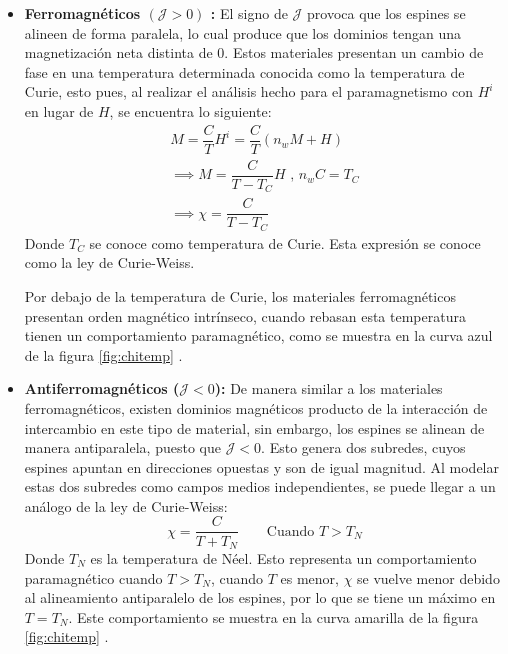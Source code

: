 \documentclass[../main.tex]{subfiles}
\begin{document}
\begin{itemize}
    \item \textbf{Ferromagnéticos $(\mathcal{J}>0)$ :} El signo de $\mathcal{J}$ provoca que los espines se alineen de forma paralela, lo cual produce que los dominios tengan una magnetización neta distinta de 0. Estos materiales presentan un cambio de fase en una temperatura determinada conocida como la temperatura de Curie, esto pues, al realizar el análisis hecho para el paramagnetismo con $H^i$ en lugar de $H$, se encuentra lo siguiente:
    \begin{equation}\begin{split}
        M=\dfrac{C}{T}H^i=\dfrac{C}{T}(n_wM+H)\\
        \implies M=\dfrac{C}{T-T_C}H\text{ , }n_wC=T_C\\
        \implies \chi=\dfrac{C}{T-T_C}
    \end{split}
        \label{eq:leycurieweiss}
    \end{equation}
    Donde $T_C$ se conoce como temperatura de Curie. Esta expresión se conoce como la ley de Curie-Weiss.

    Por debajo de la temperatura de Curie, los materiales ferromagnéticos presentan orden magnético intrínseco, cuando rebasan esta temperatura tienen un comportamiento paramagnético, como se muestra en la curva azul de la figura \ref{fig:chitemp} \cite{coey2010magnetism}.
    \item \textbf{Antiferromagnéticos ($\mathcal{J}<0$):} De manera similar a los materiales ferromagnéticos, existen dominios magnéticos producto de la interacción de intercambio en este tipo de material, sin embargo, los espines se alinean de manera antiparalela, puesto que $\mathcal{J}<0$. Esto genera dos subredes, cuyos espines apuntan en direcciones opuestas y son de igual magnitud. Al modelar estas dos subredes como campos medios independientes, se puede llegar a un análogo de la ley de Curie-Weiss:
    \begin{equation}
        \chi=\dfrac{C}{T+T_N}\qquad\text{Cuando }T>T_N
        \label{eq:tempdeneel}
    \end{equation}
    Donde $T_N$ es la temperatura de Néel. Esto representa un comportamiento paramagnético cuando $T>T_N$, cuando $T$ es menor, $\chi$ se vuelve menor debido al alineamiento antiparalelo de los espines, por lo que se tiene un máximo en $T=T_N$. Este comportamiento se muestra en la curva amarilla de la figura \ref{fig:chitemp} \cite{coey2010magnetism}.


\end{itemize}
\end{document}
